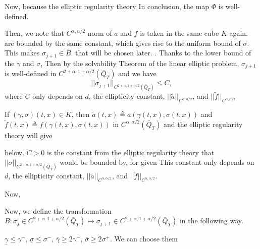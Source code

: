 \documentclass[a4paper,11pt]{article}
\def\blue{\color{blue}}
\theoremstyle{remark}
\begin{document}
Now, because the elliptic regularity theory In conclusion, the map $\Phi$ is well-defined.



Then, we note that $C^{\alpha,\alpha/2}$ norm of $a$ and $f$ is taken in the same cube $K$ again. are bounded by the same constant, which gives rise to the uniform bound of $\sigma$. This makes $\sigma_{j+1} \in B$.
that will be chosen later. . Thanks to the lower bound of the $\gamma$ and $\sigma$,  Then by {\blue the solvability Theorem} of the linear elliptic problem, $\sigma_{j+1}$ is well-defined in $C^{2+\alpha,1+\alpha/2}(\bar{Q}_T)$ and we have $$||\sigma_{j+1}||_{C^{2+\alpha,1+\alpha/2}(\bar{Q}_T)} \le C,$$ where $C$ only depends on $d$, the ellipticity constant, $||\tilde a||_{C^{\alpha,\alpha/2}}$, and $||\tilde f||_{C^{\alpha,\alpha/2}}$ 

If $(\gamma,\sigma)(t,x) \in K$, then $\tilde a(t,x)\triangleq a(\gamma(t,x),\sigma(t,x))$ and $\tilde f(t,x)\triangleq f(\gamma(t,x),\sigma(t,x))$ in $C^{\alpha,\alpha/2}(\bar{Q}_T)$ and the elliptic regularity theory will give


below. $C>0$ is the constant from the elliptic regularity theory that $||\sigma||_{C^{2+\alpha,1+\alpha/2}(\bar{Q}_T)}$ would be bounded by, for given  This constant only depends on $d$, the ellipticity constant, $||\tilde a||_{C^{\alpha,\alpha/2}}$, and $||\tilde f||_{C^{\alpha,\alpha/2}}$. 



Now, 






\pagebreak


Now, we define the transformation $B:\sigma_j\in C^{2+\alpha,1+\alpha/2}(\bar{Q}_T) \mapsto \sigma_{j+1}\in C^{2+\alpha,1+\alpha/2}(\bar{Q}_T)$ in the following way.

$\underline\gamma \le \gamma^-$, $\underline\sigma \le \sigma^-$, $\overline\gamma \ge 2\gamma^+$, $\overline\sigma \ge 2\sigma^+$. We can choose them 
\end{document}
